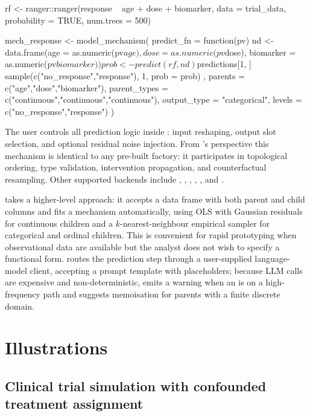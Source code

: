 \documentclass[article]{jss}
\begin{document}
\begin{CodeInput}
rf <- ranger::ranger(response ~ age + dose + biomarker,
                     data = trial_data, probability = TRUE,
                     num.trees = 500)

mech_response <- model_mechanism(
  predict_fn   = function(pv) {
    nd   <- data.frame(age       = as.numeric(pv$age),
                       dose      = as.numeric(pv$dose),
                       biomarker = as.numeric(pv$biomarker))
    prob <- predict(rf, nd)$predictions[1, ]
    sample(c("no_response","response"), 1, prob = prob)
  },
  parents      = c("age","dose","biomarker"),
  parent_types = c("continuous","continuous","continuous"),
  output_type  = "categorical",
  levels       = c("no_response","response")
)
\end{CodeInput}

\noindent
The user controls all prediction logic inside : input reshaping,
output slot selection, and optional residual noise injection. From 's
perspective this mechanism is identical to any pre-built factory: it participates
in topological ordering, type validation, intervention propagation, and
counterfactual resampling. Other supported backends include ,
, , , , and .

 takes a higher-level approach: it accepts a data frame
with both parent and child columns and fits a mechanism automatically, using OLS
with Gaussian residuals for continuous children and a $k$-nearest-neighbour
empirical sampler for categorical and ordinal children. This is convenient for
rapid prototyping when observational data are available but the analyst does not
wish to specify a functional form.  routes the prediction step
through a user-supplied language-model client, accepting a prompt template with
 placeholders; because LLM calls are expensive and
non-deterministic,  emits a warning when an
 is on a high-frequency path and suggests memoisation for
parents with a finite discrete domain.

\section{Illustrations}
\label{sec:illustrations}

\subsection{Clinical trial simulation with confounded treatment assignment}
\end{document}

